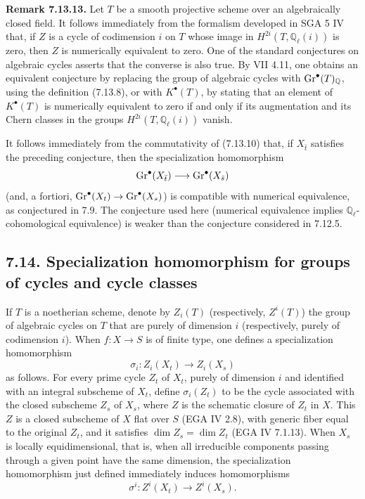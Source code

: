\textbf{Remark 7.13.13.}
Let $T$ be a smooth projective scheme over an algebraically closed field. It
follows immediately from the formalism developed in SGA 5 IV that, if $Z$ is
a cycle of codimension $i$ on $T$ whose image in
$H^{2i}(T,\mathbb Q_\ell(i))$ is zero, then $Z$ is numerically equivalent to
zero. One of the standard conjectures on algebraic cycles asserts that the
converse is also true. By VII 4.11, one obtains an equivalent conjecture by
replacing the group of algebraic cycles with $\operatorname{Gr}^\bullet(T)_{\mathbb Q}$,
using the definition (7.13.8), or with $K^\bullet(T)$, by stating that an
element of $K^\bullet(T)$ is numerically equivalent to zero if and only if
its augmentation and its Chern classes in the groups
$H^{2i}(T,\mathbb Q_\ell(i))$ vanish.

It follows immediately from the commutativity of (7.13.10) that, if
$X_{\bar t}$ satisfies the preceding conjecture, then the specialization
homomorphism
\[
\operatorname{Gr}^\bullet(X_{\bar t})\longrightarrow\operatorname{Gr}^\bullet(X_{\bar s})
\]
(and, a fortiori, $\operatorname{Gr}^\bullet(X_t)\to\operatorname{Gr}^\bullet(X_s)$) is compatible with
numerical equivalence, as conjectured in 7.9. The conjecture used here
(numerical equivalence implies $\mathbb Q_\ell$-cohomological equivalence) is
weaker than the conjecture considered in 7.12.5.

\subsection*{7.14. Specialization homomorphism for groups of cycles and cycle classes}
If $T$ is a noetherian scheme, denote by $Z_i(T)$ (respectively, $Z^i(T)$)
the group of algebraic cycles on $T$ that are purely of dimension $i$
(respectively, purely of codimension $i$). When $f:X\to S$ is of finite type,
one defines
a specialization homomorphism
\begin{equation}\tag{7.14.1}
\sigma_i:Z_i(X_t)\longrightarrow Z_i(X_s)
\end{equation}
as follows. For every prime cycle $Z_t$ of $X_t$, purely of dimension $i$ and
identified with an integral subscheme of $X_t$, define $\sigma_i(Z_t)$ to be
the cycle associated with the closed subscheme $Z_s$ of $X_s$, where $Z$ is
the schematic closure of $Z_t$ in $X$. This $Z$ is a closed subscheme of $X$
flat over $S$ (EGA IV 2.8), with generic fiber equal to the original $Z_t$,
and it satisfies $\dim Z_s=\dim Z_t$ (EGA IV 7.1.13). When $X_s$ is locally
equidimensional, that is, when all irreducible components passing through a
given point have the same dimension, the specialization homomorphism just
defined immediately induces homomorphisms
\begin{equation}\tag{7.14.1 bis}
\sigma^i:Z^i(X_t)\longrightarrow Z^i(X_s).
\end{equation}

